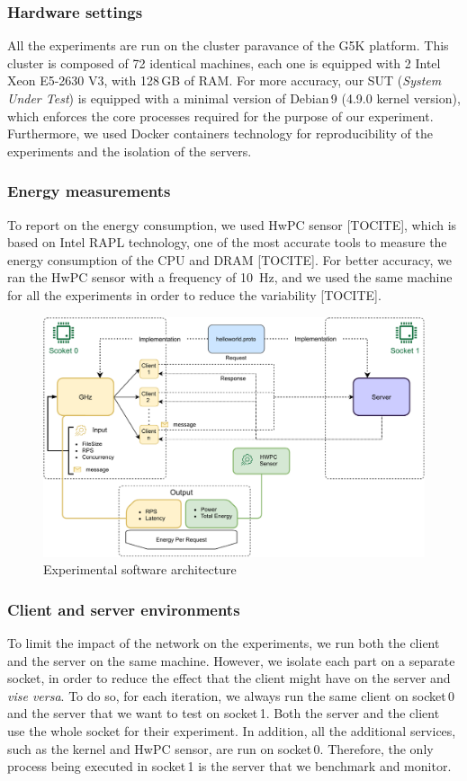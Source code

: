 \subsubsection{Hardware settings}
All the experiments are run on the cluster \textsf{paravance} of the G5K platform.
This cluster is composed of 72 identical machines, each one is equipped with 2 Intel Xeon E5-2630 V3, with 128\,GB of RAM.
For more accuracy, our SUT (\emph{System Under Test}) is equipped with a minimal version of Debian\,9 (4.9.0 kernel version), which enforces the core processes required for the purpose of our experiment.
Furthermore, we used Docker containers technology for reproducibility of the experiments and the isolation of the servers.

\subsubsection{Energy measurements}
To report on the energy consumption, we used HwPC sensor [TOCITE], which is based on Intel RAPL technology, one of the most accurate tools to measure the energy consumption of the CPU and DRAM [TOCITE].
For better accuracy, we ran the HwPC sensor with a frequency of 10~Hz, and we used the same machine for all the experiments in order to reduce the variability [TOCITE].

\begin{figure}[!hbt]
    \begin{center}
        \includegraphics[width=.8\linewidth]{imgs/rpcprotocol}
    \end{center}
    \caption{Experimental software architecture}\label{fig:rpcprotocol}
\end{figure}

\subsubsection{Client and server environments}
To limit the impact of the network on the experiments, we run both the client and the server on the same machine.
However, we isolate each part on a separate socket, in order to reduce the effect that the client might have on the server and \emph{vise versa}.
To do so, for each iteration, we always run the same client on \textsf{socket\,0} and the server that we want to test on \textsf{socket\,1}.
Both the server and the client use the whole socket for their experiment.
In addition, all the additional services, such as the kernel and HwPC sensor, are run on \textsf{socket\,0}.
Therefore, the only process being executed in \textsf{socket\,1} is the server that we benchmark and monitor.

